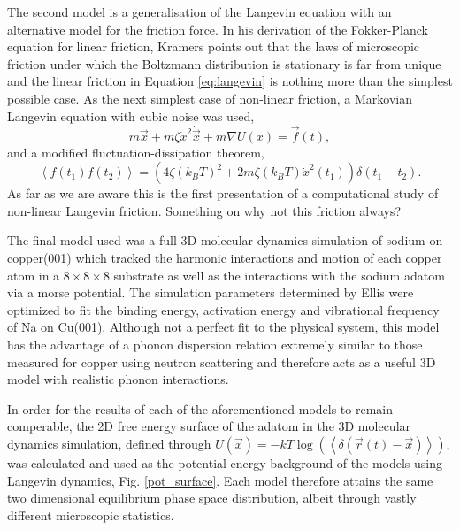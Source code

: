 \documentclass[7pt]{article}
\begin{document}
The second model is a generalisation of the Langevin equation with an alternative model for the friction force. In his derivation of the Fokker-Planck equation for linear friction, Kramers points out that the laws of microscopic friction under which the Boltzmann distribution is stationary is far from unique and the linear friction in Equation \ref{eq:langevin} is nothing more than the simplest possible case. As the next simplest case of non-linear friction, a Markovian Langevin equation with cubic noise was used,
$$
m\ddot{\vec{x}} + m\zeta\dot{x}^2\dot{\vec{x}} + m \nabla U(x) = \vec{f}(t),
$$
and a modified fluctuation-dissipation theorem\cite{Kramers},
$$\left<f(t_1)f(t_2)\right>=\left(4\zeta\left(k_BT\right)^2 + 2 m \zeta \left(k_BT\right)\dot{x}^2(t_1)\right)\delta\left(t_1-t_2\right).$$
As far as we are aware this is the first presentation of a computational study of non-linear Langevin friction. Something on why not this friction always?

The final model used was a full 3D molecular dynamics simulation of sodium on copper(001) which tracked the harmonic interactions and motion of each copper atom in a $8\times8\times8$ substrate as well as the interactions with the sodium adatom via a morse potential. The simulation parameters determined by Ellis\cite{Ellis} were optimized to fit the binding energy, activation energy and vibrational frequency of Na on Cu(001). Although not a perfect fit to the physical system, this model has the advantage of a phonon dispersion relation extremely similar to those measured for copper using neutron scattering \cite{} and therefore acts as a useful 3D model with realistic phonon interactions.

In order for the results of each of the aforementioned models to remain comperable, the 2D free energy surface of the adatom in the 3D molecular dynamics simulation, defined through $U(\vec{x}) = -kT\log\left(\left<\delta(\vec{r}(t) - \vec{x})\right>\right)$, was calculated and used as the potential energy background of the models using Langevin dynamics, Fig. \ref{pot_surface}. Each model therefore attains the same two dimensional equilibrium phase space distribution, albeit through vastly different microscopic statistics. 
\end{document}
